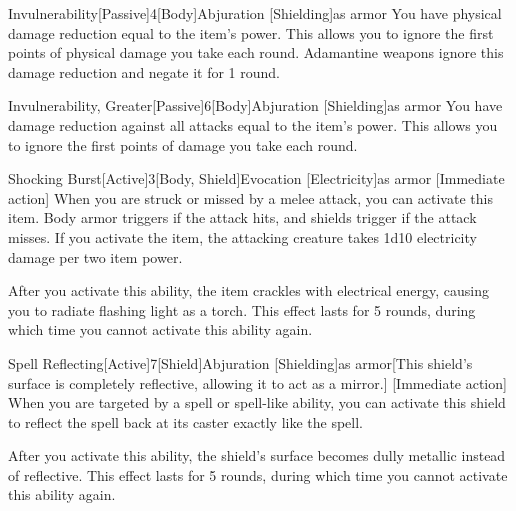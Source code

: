         \begin{magicitemdef}{Invulnerability}[Passive]{4}[Body]{Abjuration [Shielding]}{as armor}
             You have physical damage reduction equal to the item's power.
            This allows you to ignore the first points of physical damage you take each round.
            Adamantine weapons ignore this damage reduction and negate it for 1 round.
        \end{magicitemdef}

        \begin{magicitemdef}{Invulnerability, Greater}[Passive]{6}[Body]{Abjuration [Shielding]}{as armor}
             You have damage reduction against all attacks equal to the item's power.
            This allows you to ignore the first points of damage you take each round.
        \end{magicitemdef}

        \begin{magicitemdef}{Shocking Burst}[Active]{3}[Body, Shield]{Evocation [Electricity]}{as armor}
            [Immediate action] When you are struck or missed by a melee attack, you can activate this item.
            Body armor triggers if the attack hits, and shields trigger if the attack misses.
            If you activate the item, the attacking creature takes 1d10 electricity damage per two item power.

            After you activate this ability, the item crackles with electrical energy, causing you to radiate flashing light as a torch.
            This effect lasts for 5 rounds, during which time you cannot activate this ability again.
        \end{magicitemdef}

        \begin{magicitemdef}{Spell Reflecting}[Active]{7}[Shield]{Abjuration [Shielding]}{as armor}[This shield's surface is completely reflective, allowing it to act as a mirror.]
            [Immediate action] When you are targeted by a spell or spell-like ability, you can activate this shield to reflect the spell back at its caster exactly like the  spell.

            After you activate this ability, the shield's surface becomes dully metallic instead of reflective.
            This effect lasts for 5 rounds, during which time you cannot activate this ability again.
        \end{magicitemdef}

